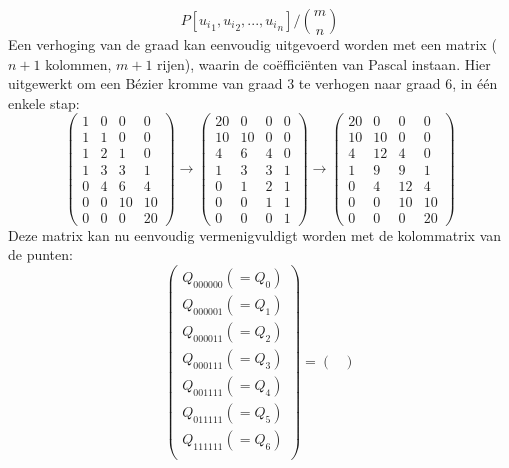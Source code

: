 \documentclass{report}
\begin{document}
\begin{itemize}
{\begin{itemize}
$$			P[{u_i}_1, {u_i}_2, ..., {u_i}_n] \bigg/ \binom{m}{n}
			$$
			Een verhoging van de graad kan eenvoudig uitgevoerd worden met een matrix ($n + 1$ kolommen, $m + 1$ rijen), waarin de coëfficiënten van Pascal instaan. Hier uitgewerkt om een Bézier kromme van graad 3 te verhogen naar graad 6, in één enkele stap:
			$$
			\begin{pmatrix}
				1 & 0 & 0  & 0  \\ 
				1 & 1 & 0  & 0  \\ 
				1 & 2 & 1  & 0  \\ 
				1 & 3 & 3  & 1  \\ 
				0 & 4 & 6  & 4  \\ 
				0 & 0 & 10 & 10 \\ 
				0 & 0 & 0  & 20 
			\end{pmatrix}
			\rightarrow
			\begin{pmatrix}
				20 & 0  & 0 & 0 \\ 
				10 & 10 & 0 & 0 \\ 
				4  & 6  & 4 & 0 \\ 
				1  & 3  & 3 & 1 \\ 
				0  & 1  & 2 & 1 \\ 
				0  & 0  & 1 & 1 \\ 
				0  & 0  & 0 & 1 
			\end{pmatrix}
			\rightarrow
			\begin{pmatrix}
				20 & 0  & 0  & 0  \\ 
				10 & 10 & 0  & 0  \\ 
				4  & 12 & 4  & 0  \\ 
				1  & 9  & 9  & 1  \\ 
				0  & 4  & 12 & 4  \\ 
				0  & 0  & 10 & 10 \\ 
				0  & 0  & 0  & 20 
			\end{pmatrix}
			$$
			Deze matrix kan nu eenvoudig vermenigvuldigt worden met de kolommatrix van de punten:
			$$
			\begin{pmatrix}
				Q_{000000} (=Q_0) \\
				Q_{000001} (=Q_1)\\
				Q_{000011} (=Q_2)\\
				Q_{000111} (=Q_3)\\
				Q_{001111} (=Q_4)\\
				Q_{011111} (=Q_5)\\
				Q_{111111} (=Q_6)\\
			\end{pmatrix}
			= 
			\begin{pmatrix}

\end{pmatrix}$$
\end{itemize}}
\end{itemize}
\end{document}
